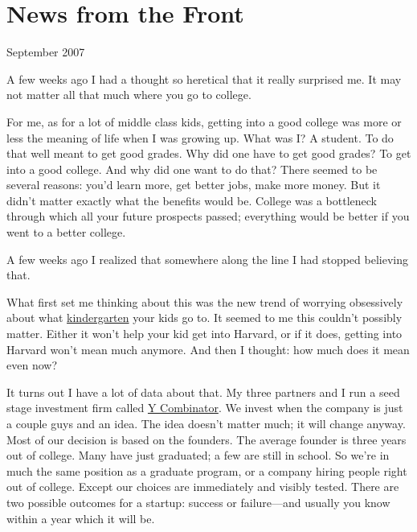 \chapter{News from the Front}


            
              
                

September 2007

A few weeks ago I had a thought so
                  heretical that it really surprised me. It may not matter all
                  that much where you go to college.

For me, as for a
                  lot of middle class kids, getting into a good college was more
                  or less the meaning of life when I was growing up. What was I?
                  A student. To do that well meant to get good grades. Why did
                  one have to get good grades? To get into a good college. And
                  why did one want to do that? There seemed to be several
                  reasons: you'd learn more, get better jobs, make more money.
                  But it didn't matter exactly what the benefits would be.
                  College was a bottleneck through which all your future
                  prospects passed; everything would be better if you went to a
                  better college.

A few weeks ago I realized that
                  somewhere along the line I had stopped believing that.

What
                  first set me thinking about this was the new trend of worrying
                  obsessively about what
                  \href{http://nymag.com/nymetro/urban/education/features/15141/}{kindergarten}
                  your kids go to. It seemed to me this couldn't possibly
                  matter. Either it won't help your kid get into Harvard, or if
                  it does, getting into Harvard won't mean much anymore. And
                  then I thought: how much does it mean even now?

It
                  turns out I have a lot of data about that. My three partners
                  and I run a seed stage investment firm called
                  \href{http://ycombinator.com}{Y Combinator}. We invest
                  when the company is just a couple guys and an idea. The idea
                  doesn't matter much; it will change anyway. Most of our
                  decision is based on the founders. The average founder is
                  three years out of college. Many have just graduated; a few
                  are still in school. So we're in much the same position as a
                  graduate program, or a company hiring people right out of
                  college. Except our choices are immediately and visibly
                  tested. There are two possible outcomes for a startup: success
                  or failure---and usually you know within a year which it
                  will be.

